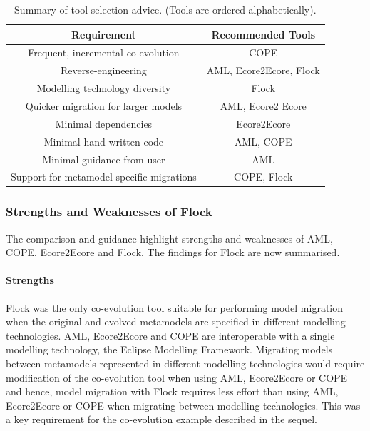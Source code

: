 \begin{table}[hbtp]
	\centering
	\begin{tabular}{|c|c|}
	\hline
	\textbf{Requirement}    & \textbf{Recommended Tools} \\
	\hline
	Frequent, incremental co-evolution                & COPE \\
	\hline
	Reverse-engineering                               & AML, Ecore2Ecore, Flock \\
	\hline
	Modelling technology diversity                    & Flock \\
	\hline
	Quicker migration for larger models               & AML, Ecore2 Ecore \\
	\hline
	Minimal dependencies                              & Ecore2Ecore \\
	\hline
	Minimal hand-written code                         & AML, COPE \\
	\hline
	Minimal guidance from user                        & AML \\
	\hline
	Support for metamodel-specific migrations   & COPE, Flock \\
	\hline
	\end{tabular}
	\caption[Summary of tool selection advice]{Summary of tool selection advice. (Tools are ordered alphabetically).}
	\label{tab:advice}
\end{table}

\subsubsection{Strengths and Weaknesses of Flock}
The comparison and guidance highlight strengths and weaknesses of AML, COPE, Ecore2Ecore and Flock. The findings for Flock are now summarised.

\paragraph{Strengths} Flock was the only co-evolution tool suitable for performing model migration when the original and evolved metamodels are specified in different modelling technologies. AML, Ecore2Ecore and COPE are interoperable with a single modelling technology, the Eclipse Modelling Framework. Migrating models between metamodels represented in different modelling technologies would require modification of the co-evolution tool when using AML, Ecore2Ecore or COPE and hence, model migration with Flock requires less effort than using AML, Ecore2Ecore or COPE when migrating between modelling technologies. This was a key requirement for the co-evolution example described in the sequel.

